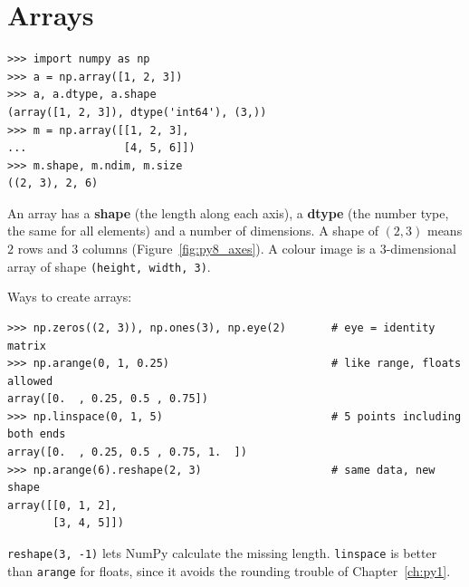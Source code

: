 \section*{Arrays}
\begin{verbatim}
>>> import numpy as np
>>> a = np.array([1, 2, 3])
>>> a, a.dtype, a.shape
(array([1, 2, 3]), dtype('int64'), (3,))
>>> m = np.array([[1, 2, 3],
...               [4, 5, 6]])
>>> m.shape, m.ndim, m.size
((2, 3), 2, 6)
\end{verbatim}
An array has a \textbf{shape} (the length along each axis), a \textbf{dtype} (the number type, the same for all elements) and a number of dimensions. A shape of $(2,3)$ means $2$ rows and $3$ columns (Figure~\ref{fig:py8_axes}). A colour image is a $3$-dimensional array of shape \texttt{(height, width, 3)}.
\begin{center}
\label{fig:py8_axes}
\end{center}
Ways to create arrays:
\begin{verbatim}
>>> np.zeros((2, 3)), np.ones(3), np.eye(2)       # eye = identity matrix
>>> np.arange(0, 1, 0.25)                         # like range, floats allowed
array([0.  , 0.25, 0.5 , 0.75])
>>> np.linspace(0, 1, 5)                          # 5 points including both ends
array([0.  , 0.25, 0.5 , 0.75, 1.  ])
>>> np.arange(6).reshape(2, 3)                    # same data, new shape
array([[0, 1, 2],
       [3, 4, 5]])
\end{verbatim}
\verb!reshape(3, -1)! lets NumPy calculate the missing length. \texttt{linspace} is better than \texttt{arange} for floats, since it avoids the rounding trouble of Chapter~\ref{ch:py1}.

